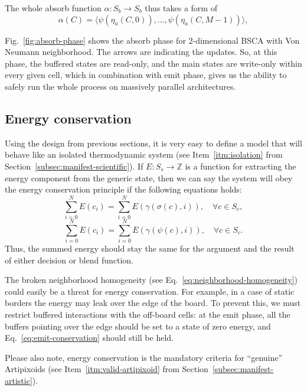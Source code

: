\documentclass[a4paper,12pt,tikz,UTF8]{article}
\begin{document}
    The whole absorb function $\alpha: S_b \to S_b$ thus takes a form of
    \begin{equation}
      \alpha(C) = \langle \psi(\eta_a(C, 0)), ..., \psi(\eta_a(C, M - 1)) \rangle,
    \end{equation}

    Fig.~\ref{fig:absorb-phase} shows the absorb phase for 2-dimensional BSCA with Von Neumann neighborhood. The arrows are indicating the updates. So, at this phase, the buffered states are read-only, and the main states are write-only within every given cell, which in combination with emit phase, gives us the ability to safely run the whole process on massively parallel architectures.

  \subsection{Energy conservation}
    \label{subsec:energy-conservation}
    Using the design from previous sections, it is very easy to define a model that will behave like an isolated thermodynamic system (see Item~\ref{itm:isolation} from Section~\ref{subsec:manifest-scientific}). If $E: S_s \to \mathbb{Z}$ is a function for extracting the energy component from the generic state, then we can say the system will obey the energy conservation principle if the following equations holds:
    \begin{equation}
      \label{eq:emit-conservation}
      \sum_{i=0}^{N}{E(c_i)} = \sum_{i=0}^{N}{E(\gamma(\sigma(c), i))}, \quad \forall c \in S_c,
    \end{equation}
    \begin{equation}
      \sum_{i=0}^{N}{E(c_i)} = \sum_{i=0}^{N}{E(\gamma(\psi(c), i))}, \quad \forall c \in S_c.
    \end{equation}
    Thus, the summed energy should stay the same for the argument and the result of either decision or blend function.

    The broken neighborhood homogeneity (see Eq.~\ref{eq:neighborhood-homogeneity}) could easily be a threat for energy conservation. For example, in a case of static borders the energy may leak over the edge of the board. To prevent this, we must restrict buffered interactions with the off-board cells: at the emit phase, all the buffers pointing over the edge should be set to a state of zero energy, and Eq.~\ref{eq:emit-conservation} should still be held.

    Please also note, energy conservation is the mandatory criteria for ``genuine'' Artipixoids (see Item~\ref{itm:valid-artipixoid} from Section~\ref{subsec:manifest-artistic}).
\end{document}

